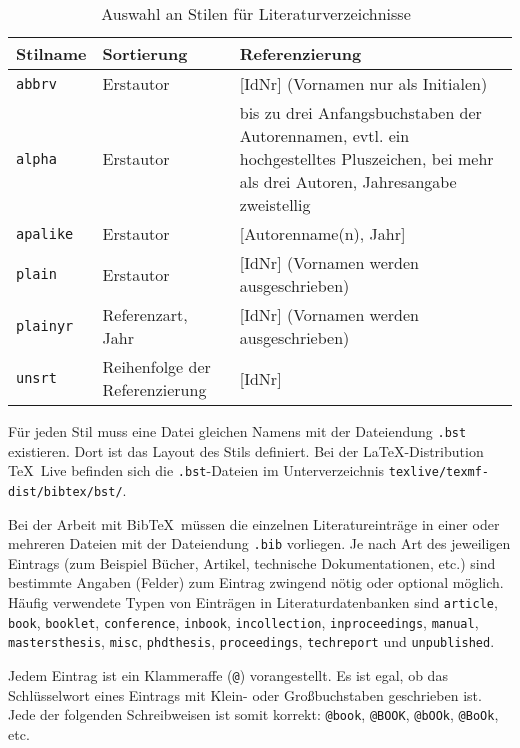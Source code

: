 \begin{table}[h!tb]
	\centering
	\caption[Auswahl an Stilen für Literaturverzeichnisse]{Auswahl an Stilen für Literaturverzeichnisse~\cite{Wikibooks_LaTeX_Woerterbuch}}
	\label{Tabelle_Stile_Literaturverzeichnisse}       %
	\begin{tabularx}{\textwidth}{lp{3cm}p{7.5cm}}
		\hline
		Stilname & Sortierung & Referenzierung  \\
		\hline
		\texttt{abbrv} & Erstautor & [IdNr] (Vornamen nur als Initialen) \\
		\texttt{alpha} & Erstautor & bis zu drei Anfangsbuchstaben der Autorennamen, evtl. ein hochgestelltes Pluszeichen, bei mehr als drei Autoren, Jahresangabe zweistellig \\			
		\texttt{apalike} & Erstautor & [Autorenname(n), Jahr] \\
		\texttt{plain}   & Erstautor & [IdNr] (Vornamen werden ausgeschrieben) \\
        \texttt{plainyr} & Referenzart, Jahr   & [IdNr] (Vornamen werden ausgeschrieben) \\
        \texttt{unsrt}   & Reihenfolge der Referenzierung & [IdNr] \\
		\hline
	\end{tabularx}
\end{table}

Für jeden Stil muss eine Datei gleichen Namens mit der Dateiendung \verb!.bst! existieren. Dort ist das Layout des Stils definiert.
Bei der \LaTeX-Distribution \TeX~Live befinden sich die \verb!.bst!-Dateien im Unterverzeichnis \verb|texlive/texmf-dist/bibtex/bst/|.


Bei der Arbeit mit Bib\TeX\ müssen die einzelnen Literatureinträge in einer oder mehreren Dateien mit der Dateiendung
\verb|.bib| vorliegen. Je nach Art des jeweiligen Eintrags (zum Beispiel Bücher, Artikel, technische Dokumentationen, etc.) sind bestimmte Angaben (\glqq Felder\grqq) zum Eintrag zwingend nötig oder optional möglich. Häufig verwendete Typen von Einträgen in Literaturdatenbanken sind \texttt{article}, \texttt{book}, \texttt{booklet}, \texttt{conference}, \texttt{inbook}, \texttt{incollection}, \texttt{inproceedings}, \texttt{manual}, \texttt{mastersthesis}, \texttt{misc}, \texttt{phdthesis}, \texttt{proceedings}, \texttt{techreport} und \texttt{unpublished}.

Jedem Eintrag ist ein Klammeraffe (\verb!@!) vorangestellt. Es ist egal, ob das Schlüsselwort eines
Eintrags mit Klein- oder Großbuchstaben 
geschrieben ist. Jede der folgenden Schreibweisen ist somit korrekt: \verb!@book!, \verb!@BOOK!, 
\verb!@bOOk!, \verb!@BoOk!, etc.

